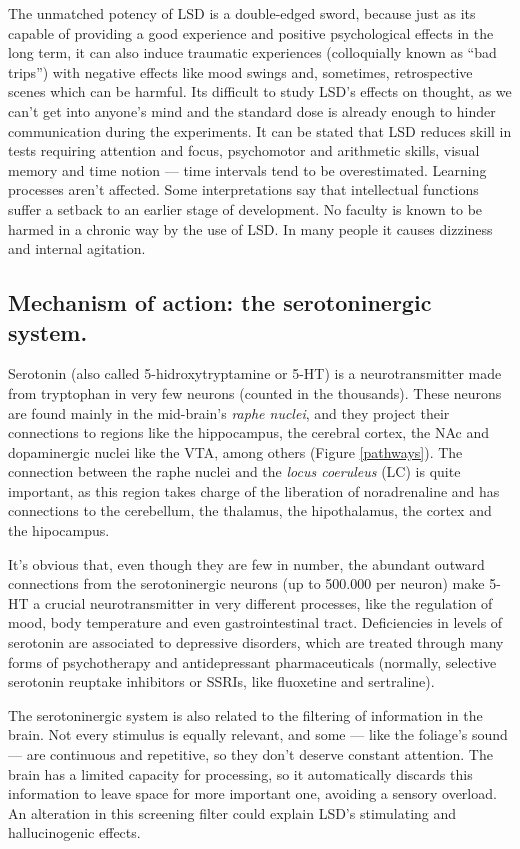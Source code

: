 The unmatched potency of LSD is a double-edged sword, because just as its capable of providing a good experience and positive psychological effects in the long term, it can also induce traumatic experiences (colloquially known as \enquote{bad trips}) with negative effects like mood swings and, sometimes, retrospective scenes which can be harmful. Its difficult to study LSD's effects on thought, as we can't get into anyone's mind and the standard dose is already enough to hinder communication during the experiments. It can be stated that LSD reduces skill in tests requiring attention and focus, psychomotor and arithmetic skills, visual memory and time notion --- time intervals tend to be overestimated. Learning processes aren't affected. Some interpretations say that intellectual functions suffer a setback to an earlier stage of development. No faculty is known to be harmed in a chronic way by the use of LSD. In many people it causes dizziness and internal agitation.

\subsection{Mechanism of action: the serotoninergic system.}

Serotonin (also called 5-hidroxytryptamine or 5-HT) is a neurotransmitter made from tryptophan in very few neurons (counted in the thousands). These neurons are found mainly in the mid-brain's \textit{raphe nuclei}, and they project their connections to regions like the hippocampus, the cerebral cortex, the NAc and dopaminergic nuclei like the VTA, among others (Figure \ref{pathways}). The connection between the raphe nuclei and the \textit{locus coeruleus} (LC) is quite important, as this region takes charge of the liberation of noradrenaline and has connections to the cerebellum, the thalamus, the hipothalamus, the cortex and the hipocampus.

It's obvious that, even though they are few in number, the abundant outward connections from the serotoninergic neurons (up to 500.000 per neuron) make 5-HT a crucial neurotransmitter in very different processes, like the regulation of mood, body temperature and even gastrointestinal tract. Deficiencies in levels of serotonin are associated to depressive disorders, which are treated through many forms of psychotherapy and antidepressant pharmaceuticals (normally, selective serotonin reuptake inhibitors or SSRIs, like fluoxetine and sertraline).

The serotoninergic system is also related to the filtering of information in the brain. Not every stimulus is equally relevant, and some --- like the foliage's sound --- are continuous and repetitive, so they don't deserve constant attention. The brain has a limited capacity for processing, so it automatically discards this information to leave space for more important one, avoiding a sensory overload. An alteration in this screening filter could explain LSD's stimulating and hallucinogenic effects.

